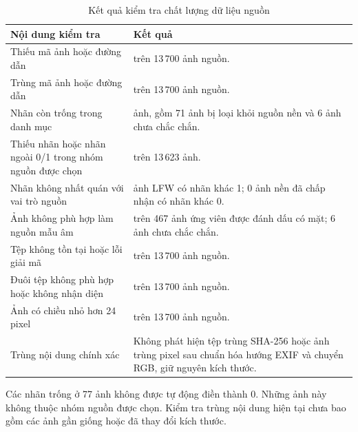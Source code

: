 \documentclass[12pt,a4paper,oneside]{report}
\begin{document}
\begin{table}[H]
    \centering
    \caption{Kết quả kiểm tra chất lượng dữ liệu nguồn}
    \label{tab:kiemtra_chatluong_nguon}
    \small
    \begin{tabularx}{\textwidth}{
        >{\raggedright\arraybackslash}p{4.5cm}
        >{\raggedright\arraybackslash}X}
        \toprule
        \textbf{Nội dung kiểm tra}
        & \textbf{Kết quả} \\
        \midrule

        Thiếu mã ảnh hoặc đường dẫn
        & 0 trên 13\,700 ảnh nguồn. \\

        Trùng mã ảnh hoặc đường dẫn
        & 0 trên 13\,700 ảnh nguồn. \\

        Nhãn còn trống trong danh mục
        & 77 ảnh, gồm 71 ảnh bị loại khỏi nguồn nền
          và 6 ảnh chưa chắc chắn. \\

        Thiếu nhãn hoặc nhãn ngoài 0/1
        trong nhóm nguồn được chọn
        & 0 trên 13\,623 ảnh. \\

        Nhãn không nhất quán với vai trò nguồn
        & 0 ảnh LFW có nhãn khác 1;
          0 ảnh nền đã chấp nhận có nhãn khác 0. \\

        Ảnh không phù hợp làm nguồn mẫu âm
        & 71 trên 467 ảnh ứng viên được đánh dấu có mặt;
          6 ảnh chưa chắc chắn. \\

        Tệp không tồn tại hoặc lỗi giải mã
        & 0 trên 13\,700 ảnh nguồn. \\

        Đuôi tệp không phù hợp hoặc không nhận diện
        & 0 trên 13\,700 ảnh nguồn. \\

        Ảnh có chiều nhỏ hơn 24 pixel
        & 0 trên 13\,700 ảnh nguồn. \\

        Trùng nội dung chính xác
        & Không phát hiện tệp trùng SHA-256 hoặc
          ảnh trùng pixel sau chuẩn hóa hướng EXIF
          và chuyển RGB, giữ nguyên kích thước. \\

        \bottomrule
    \end{tabularx}
\end{table}

Các nhãn trống ở 77 ảnh không được tự động điền thành 0.
Những ảnh này không thuộc nhóm nguồn được chọn.
Kiểm tra trùng nội dung hiện tại chưa bao gồm
các ảnh gần giống hoặc đã thay đổi kích thước.
\end{document}
